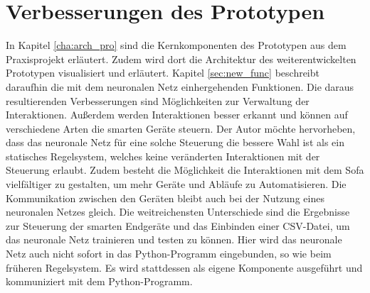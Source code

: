 \section{Verbesserungen des Prototypen}
\label{sec:verbesserungen}
In Kapitel \ref{cha:arch_pro} sind die Kernkomponenten des Prototypen aus dem Praxisprojekt erläutert. Zudem wird dort die Architektur des weiterentwickelten Prototypen visualisiert und erläutert. Kapitel \ref{sec:new_func} beschreibt daraufhin die mit dem neuronalen Netz einhergehenden Funktionen. Die daraus resultierenden Verbesserungen sind Möglichkeiten zur Verwaltung der Interaktionen. Außerdem werden Interaktionen besser erkannt und können auf verschiedene Arten die smarten Geräte steuern. Der Autor möchte hervorheben, dass das neuronale Netz für eine solche Steuerung die bessere Wahl ist als ein statisches Regelsystem, welches keine veränderten Interaktionen mit der Steuerung erlaubt. Zudem besteht die Möglichkeit die Interaktionen mit dem Sofa vielfältiger zu gestalten, um mehr Geräte und Abläufe zu Automatisieren. 
\newline
\newline
Die Kommunikation zwischen den Geräten bleibt auch bei der Nutzung eines neuronalen Netzes gleich. Die weitreichensten Unterschiede sind die Ergebnisse zur Steuerung der smarten Endgeräte und das Einbinden einer CSV-Datei, um das neuronale Netz trainieren und testen zu können. Hier wird das neuronale Netz auch nicht sofort in das Python-Programm eingebunden, so wie beim früheren Regelsystem. Es wird stattdessen als eigene Komponente ausgeführt und kommuniziert mit dem Python-Programm.
